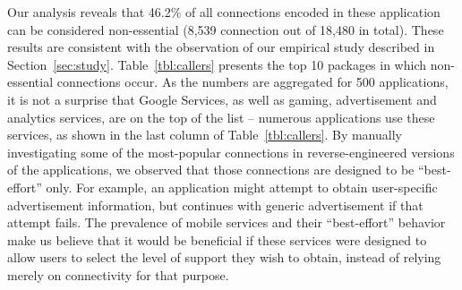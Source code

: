 Our analysis reveals that 46.2\% of all connections encoded in these application can be considered non-essential (8,539 connection out of 18,480 in total).
These results are consistent with the observation of our empirical study described in Section~\ref{sec:study}.
Table~\ref{tbl:callers} presents the top 10 packages in which
non-essential connections occur.  As the numbers are aggregated for
500 applications, it is not a surprise that Google Services, as well
as gaming, advertisement and analytics services, are on the top of the
list -- numerous applications use these services, as shown in the last
column of Table~\ref{tbl:callers}.  By manually investigating some of
the most-popular connections in reverse-engineered versions of the
applications, we observed that those connections are designed to be
``best-effort'' only. For example, an application might attempt to
obtain user-specific advertisement information, but continues with
generic advertisement if that attempt fails.  The prevalence of mobile
services and their ``best-effort'' behavior make us believe that it
would be beneficial if these services were designed to allow users to
select the level of support they wish to obtain, instead of relying
merely on connectivity for that purpose.

 






